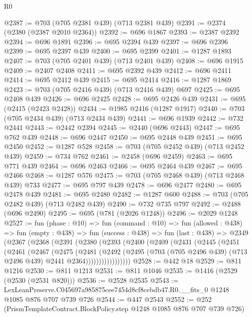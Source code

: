 \begin{lexlean}{R0}
\begin{coremodule}
@2387 := @703 (@705 @2381 @439) (@713 @2381 @439)
@2391 := @2374 (@2380 (@2387 @2010 @2364))
@2392 := @696 @1867
@2393 := @2387 @2392
@2394 := @696 @1891
@2396 := @695 @2394 @439
@2397 := @696 @2396
@2399 := @695 @2397 @439
@2400 := @695 @2399
@2401 := @1287 @1893
@2407 := @703 (@705 @2401 @439) (@713 @2401 @439)
@2408 := @696 @1915
@2409 := @2407 @2408
@2411 := @695 @2392 @439
@2412 := @696 @2411
@2414 := @695 @2412 @439
@2415 := @695 @2414
@2416 := @1287 @1869
@2423 := @703 (@705 @2416 @439) (@713 @2416 @439) @697
@2425 := @695 @2408 @439
@2426 := @696 @2425
@2428 := @695 @2426 @439
@2431 := @695 (@2415 (@2423 @2428))
@2434 := @1985 @2416 (@1287 @1917)
@2440 := @703 (@705 @2434 @439) (@713 @2434 @439)
@2441 := @696 @1939
@2442 := @732 @2441
@2443 := @2442 @2394
@2445 := @2440 (@696 @2443)
@2447 := @695 @762 @439
@2448 := @696 @2447
@2450 := @695 @2448 @439
@2451 := @695 @2450
@2452 := @1287 @528
@2458 := @703 (@705 @2452 @439) (@713 @2452 @439)
@2459 := @734 @762
@2461 := @2458 (@696 @2459)
@2463 := @695 @771 @439
@2464 := @696 @2463
@2466 := @695 @2464 @439
@2467 := @695 @2466
@2468 := @1287 @576
@2475 := @703 (@705 @2468 @439) (@713 @2468 @439) @733
@2477 := @695 @797 @439
@2478 := @696 @2477
@2480 := @695 @2478 @439
@2481 := @695 @2480
@2482 := @1287 @600
@2488 := @703 (@705 @2482 @439) (@713 @2482 @439)
@2490 := @732 @735 @797
@2492 := @2488 (@696 @2490)
@2495 := @695 (@781 (@2026 @1248))
@2496 := @2029 @1248
@2527 := fun (phase : @10) =>
  fun (command : @10) =>
  fun (allowed : @438) =>
  fun (empty : @438) =>
  fun (success : @438) =>
  fun (last : @438) =>
  @2349
    (@2367
      (@2368
        (@2391
          (@2380
            (@2393
              (@2400
                (@2409
                  (@2431
                    (@2445
                      (@2451
                        (@2461
                          (@2467
                            (@2475
                              (@2481
                                (@2492
                                  (@2495
                                    (@703
                                      (@705 @2496 @439)
                                      (@713 @2496 @439)
                                      @2441
                                      @2364)))))))))))))))))
@2528 := @442 @18
@2529 := @811 @1216
@2530 := @811 @1213
@2531 := @811 @1046
@2535 := @1416 (@2529 (@2530 (@2531 @820)))
@2536 := @2528 @2535
@2543 := LexLeanPreserve.C045697a985875cee7454d8cf8cebdb47.R0.__fits_0
    @1248
    @1085
    @876
    @707
    @739
    @726
@2544 := @447 @2543
@2552 := @252 (PrismTemplateContract.BlockPolicy.step @1248 @1085 @876 @707 @739 @726)

\end{coremodule}
\end{lexlean}
